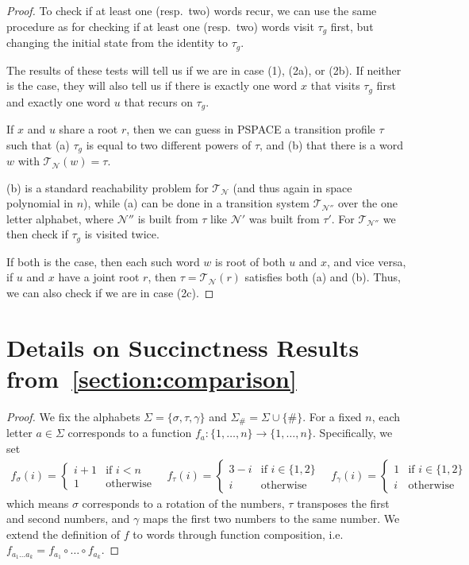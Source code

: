 \documentclass[a4paper,USenglish,cleveref,autoref,thm-restate]{lipics-v2021}
\newcommand{\mc}[1]{\ensuremath{\mathcal{#1}}}
\newcommand{\T}{\mc{T}}
\newcommand{\N}{\mc{N}}
\newcommand{\PSPACE}{\textsf{PSPACE}\xspace}
\begin{document}
{\begin{proof}
    To check if at least one (resp.\ two) words recur, we can use the same procedure as for checking if at least one (resp.\ two) words visit $\tau_g$ first, but changing the initial state from the identity to $\tau_g$.

    The results of these tests will tell us if we are in case (1), (2a), or (2b). If neither is the case, they will also tell us if there is exactly one word $x$ that visits $\tau_g$ first and exactly one word $u$ that recurs on $\tau_g$.

    If $x$ and $u$ share a root $r$, then we can guess in \PSPACE a transition profile $\tau$ such that (a) $\tau_g$ is equal to two different powers of $\tau$, and (b) that there is a word $w$ with $\T_{\N}(w) = \tau$.

    (b) is a standard reachability problem for $\T_{\N}$ (and thus again in space polynomial in $n$), while (a) can be done in a transition system $\T_{\N''}$ over the one letter alphabet, where $\N''$ is built from $\tau$ like $\N'$ was built from $\tau'$.
    For $\T_{\N''}$ we then check if $\tau_g$ is visited twice.

    If both is the case, then each such word $w$ is root of both $u$ and $x$, and vice versa, if $u$ and $x$ have a joint root $r$, then $\tau=\T_{\N}(r)$ satisfies both (a) and (b).
    Thus, we can also check if we are in case (2c).
\end{proof} \section{Details on Succinctness Results from~\cref{section:comparison}}
\label{section:appendixcomparison}
\lowerboundCombinedToSatFDFA*
\begin{proof}
  We fix the alphabets $\Sigma = \{\sigma, \tau, \gamma\}$ and $\Sigma_\# = \Sigma \cup \{\#\}$.
  For a fixed $n$, each letter $a \in \Sigma$ corresponds to a function $f_a : \{1,\dotsc,n\} \to \{1,\dotsc,n\}$.
  Specifically, we set
  \begin{align*}
    f_\sigma(i) =
    \begin{cases}
      i + 1 & \text{if } i < n \\
      1     & \text{otherwise}
    \end{cases}
    \quad
    f_\tau(i) =
    \begin{cases}
      3 - i & \text{if } i \in \{1,2\} \\
      i     & \text{otherwise}
    \end{cases}
    \quad
    f_\gamma(i) =
    \begin{cases}
      1 & \text{if } i \in \{1,2\} \\
      i & \text{otherwise}
    \end{cases}
  \end{align*}
  which means $\sigma$ corresponds to a rotation of the numbers, $\tau$ transposes the first and second numbers, and $\gamma$ maps the first two numbers to the same number.
  We extend the definition of $f$ to words through function composition, i.e.~$f_{a_1 \dotsc a_k} = f_{a_1} \circ \dotsc \circ f_{a_k}$.
  

\end{proof}}
\end{document}
